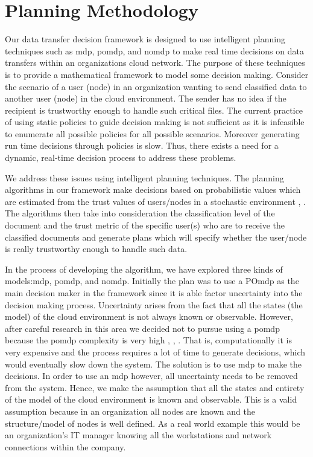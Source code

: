 \section{Planning Methodology}
Our data transfer decision framework is designed to use intelligent planning
techniques such as \gls{mdp}, \gls{pomdp}, and \gls{nomdp} to
make real time decisions on data transfers within an organizations cloud
network. The purpose of these techniques is to provide a mathematical framework
to model some decision making. Consider the scenario of a user (node) in an
organization wanting to send classified data to another user (node) in the cloud
environment. The sender has no idea if the recipient is trustworthy enough to
handle such critical files. The current practice of using static policies to
guide decision making is not sufficient as it is infeasible to enumerate all
possible policies for all possible scenarios. Moreover generating run time
decisions through policies is slow. Thus, there exists a need for a dynamic,
real-time decision process to address these problems. 

We address these issues using intelligent planning techniques. The planning
algorithms in our framework make decisions based on probabilistic values which
are estimated from the trust values of users/nodes in a stochastic environment
\autocite{JMarecki2012}, \autocite{JWu.2011}. The algorithms then take into consideration the classification level
of the document and the trust metric of the specific user(s) who are to receive
the classified documents and generate plans which will specify whether the
user/node is really trustworthy enough to handle such data.  

In the process of
developing the algorithm, we have explored three kinds of models:\gls{mdp},
\gls{pomdp}, and \gls{nomdp}. Initially the plan was to use a PO\gls{mdp} as the 
main decision maker in the
framework since it is able factor uncertainty into the decision making process.
Uncertainty arises from the fact that all the states (the model) of the cloud
environment is not always known or observable. However, after careful research
in this area we decided not to pursue using a \gls{pomdp} because the
\gls{pomdp} complexity
is very high \autocite{LeslieP.Kaelbling1998}, \autocite{Zilberman},
\autocite{DongNguyen2009}. 
That is, computationally it is very expensive and the
process requires a lot of time to generate decisions, which would eventually
slow down the system. The solution is to use \gls{mdp} to make the decisions. In order
to use an \gls{mdp} however, all uncertainty needs to be removed from the system.
Hence, we make the assumption that all the states and entirety of the model of
the cloud environment is known and observable. This is a valid assumption
because in an organization all nodes are known and the structure/model of nodes
is well defined. As a real world example this would be an organization’s IT
manager knowing all the workstations and network connections within the company.

